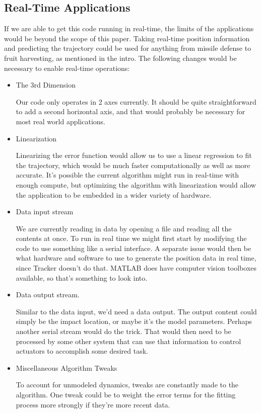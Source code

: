 \subsection{Real-Time Applications}
If we are able to get this code running in real-time, the limits of the applications would be beyond the scope of this paper. Taking real-time position information and predicting the trajectory could be used for anything from missile defense to fruit harvesting, as mentioned in the intro. The following changes would be necessary to enable real-time operations:
\begin{itemize}

\item The 3rd Dimension

Our code only operates in 2 axes currently. It should be quite straightforward to add a second horizontal axis, and that would probably be necessary for most real world applications.

\item Linearization 

Linearizing the error function would allow us to use a linear regression to fit the trajectory, which would be much faster computationally as well as more accurate. It's possible the current algorithm might run in real-time with enough compute, but optimizing the algorithm with linearization would allow the application to be embedded in a wider variety of hardware.
 
\item Data input stream 

We are currently reading in data by opening a file and reading all the contents at once. To run in real time we might first start by modifying the code to use something like a serial interface. A separate issue would then be what hardware and software to use to generate the position data in real time, since Tracker doesn't do that. MATLAB does have computer vision toolboxes available, so that's something to look into.

\item Data output stream.

Similar to the data input, we'd need a data output. The output content could simply be the impact location, or maybe it's the model parameters. Perhaps another serial stream would do the trick. That would then need to be processed by some other system that can use that information to control actuators to accomplish some desired task. 

\item Miscellaneous Algorithm Tweaks

To account for unmodeled dynamics, tweaks are constantly made to the algorithm. One tweak could be to weight the error terms for the fitting process more strongly if they're more recent data.

\end{itemize}
